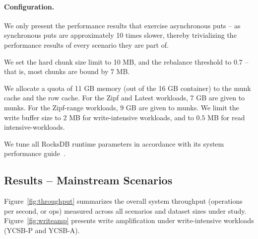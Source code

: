 \paragraph{Configuration.} 

We only present the performance results that exercise asynchronous puts -- as synchronous puts 
are approximately 10 times slower, thereby trivializing the performance results of every scenario 
they are part of. 

We set the \sys\/ hard chunk size limit to 10 MB, and the rebalance threshold to $0.7$ -- that is, 
most chunks are bound by 7 MB. 

We allocate a quota of 11 GB memory (out of the 16 GB container) to the munk cache and the row cache. 
For the Zipf and Latest workloads, 7 GB are given to munks. For the Zipf-range workloads, 9 GB 
are given to munks.  We limit the write buffer size to 2 MB for write-intensive workloads, and to $0.5$ MB 
for read intensive-workloads. 
  
We tune all RocksDB runtime parameters in accordance with its system performance guide~\cite{RocksDBPerf}.   

\subsection{Results -- Mainstream Scenarios}

\begin{figure*}
\caption{\bf{\sys\/ versus RocksDB throughput, under multiple workloads and scaling dataset sizes.}}
\label{fig:throughput}
\end{figure*}

\begin{figure*}
\caption{\bf{\sys\/ versus RocksDB write amplification, under write-intensive workloads and scaling dataset sizes.}}
\label{fig:writeamp}
\end{figure*}

Figure~\ref{fig:throughput} summarizes the overall system throughput (operations per second, or ops) 
measured across all scenarios and dataset sizes under study. Figure~\ref{fig:writeamp} presents write 
amplification under write-intensive workloads (YCSB-P and YCSB-A). 


